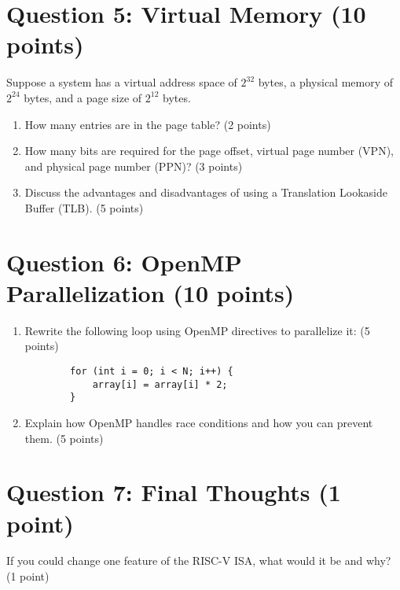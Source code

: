 \documentclass[11pt]{article}
\begin{document}
\section*{Question 5: Virtual Memory (10 points)}
Suppose a system has a virtual address space of \(2^{32}\) bytes, a physical memory of \(2^{24}\) bytes, and a page size of \(2^{12}\) bytes.
\begin{enumerate}[label=\textbf{Q5.\arabic*}]
    \item How many entries are in the page table? (2 points)
    \item How many bits are required for the page offset, virtual page number (VPN), and physical page number (PPN)? (3 points)
    \item Discuss the advantages and disadvantages of using a Translation Lookaside Buffer (TLB). (5 points)
\end{enumerate}

\section*{Question 6: OpenMP Parallelization (10 points)}
\begin{enumerate}[label=\textbf{Q6.\arabic*}]
    \item Rewrite the following loop using OpenMP directives to parallelize it: (5 points)
    \begin{verbatim}
        for (int i = 0; i < N; i++) {
            array[i] = array[i] * 2;
        }
    \end{verbatim}
    \item Explain how OpenMP handles race conditions and how you can prevent them. (5 points)
\end{enumerate}

\section*{Question 7: Final Thoughts (1 point)}
If you could change one feature of the RISC-V ISA, what would it be and why? (1 point)
\end{document}
